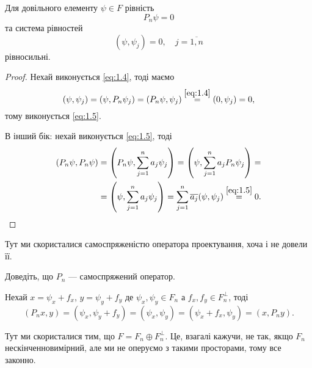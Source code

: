 \begin{lemma}
    Для довільного елементу $\psi \in F$ рівність
    \begin{equation}
        \label{eq:1.4}
        P_n \psi = 0
    \end{equation}
    та система рівностей
    \begin{equation}
        \label{eq:1.5}
        (\psi, \psi_j) = 0, \quad j = \overline{1, n}
    \end{equation}
    рівносильні.
\end{lemma}
\begin{proof}
    Нехай виконується \eqref{eq:1.4}, тоді маємо 
    \begin{equation*}
        (\psi, \psi_j) = (\psi, P_n \psi_j) = (P_n \psi, \psi_j) \overset{\eqref{eq:1.4}}{=} (0, \psi_j) = 0,
    \end{equation*}
    тому виконується \eqref{eq:1.5}. \medskip
    
    В інший бік: нехай виконується \eqref{eq:1.5}, тоді 
    \begin{equation*}
        \begin{aligned}
            (P_n \psi, P_n \psi) &= \left(P_n \psi, \sum_{j = 1}^n a_j \psi_j \right) = \left(\psi, \sum_{j = 1}^n a_j P_n \psi_j \right) = \\
            &= \left(\psi, \sum_{j = 1}^n a_j \psi_j \right) = \sum_{j = 1}^n \overline{a_j} (\psi, \psi_j) \overset{\eqref{eq:1.5}}{=} 0.
        \end{aligned}
    \end{equation*}
\end{proof}
\begin{remark}
    Тут ми скористалися самоспряженістю оператора проектування, хоча і не довели її.
\end{remark}
\begin{exercise}
    Доведіть, що $P_n$ --- самоспряжений оператор.
\end{exercise}
\begin{solution}
    Нехай $x = \psi_x + f_x$, $y = \psi_y + f_y$ де $\psi_x, \psi_y \in F_n$ а $f_x, f_y \in F_n^\perp$, тоді 
    \begin{equation*}
        (P_n x, y) = (\psi_x, \psi_y + f_y) = (\psi_x, \psi_y) = (\psi_x + f_x, \psi_y) = (x, P_n y).
    \end{equation*}
\end{solution}
\begin{remark}
    Тут ми скористалися тим, що $F = F_n \oplus F_n^\perp$. Це, взагалі кажучи, не так, якщо $F_n$ нескінченновимірний, але ми не оперуємо з такими просторами, тому все законно.
\end{remark}

